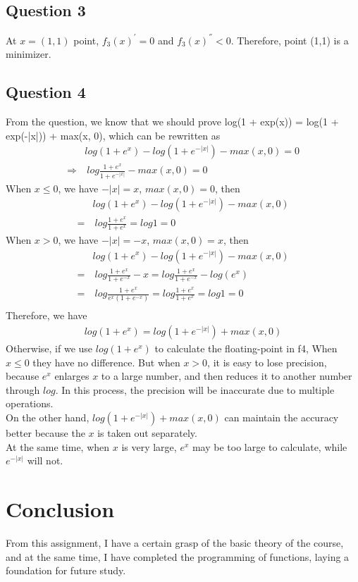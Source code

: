 \documentclass[a4paper,12pt]{article}
\begin{document}
\subsection{Question 3}
At $x = (1,1)$ point, $f_3(x)^{'} = 0$ and  $f_3(x)^{''} < 0$. Therefore, point (1,1) is a minimizer.
\subsection{Question 4}
From the question, we know that we should prove log(1 + exp(x)) = log(1 + exp(-|x|)) + max(x, 0), which can be rewritten as 
\begin{align*}
&log(1 + e^x) - log(1 + e^{-|x|}) - max(x, 0) = 0\\
\Rightarrow &\ log\frac{1 + e^x}{1 + e^{-|x|}} - max(x, 0) = 0
\end{align*}
When $x \leq 0$, we have $-|x| = x$, $max(x, 0) = 0$, then
\begin{align*}
&log(1 + e^x) - log(1 + e^{-|x|}) - max(x, 0) \\
=&\ log\frac{1 + e^x}{1 + e^{x}} = log1 = 0
\end{align*}
When $x > 0$, we have $-|x| = -x$, $max(x, 0) = x$, then
\begin{align*}
&log(1 + e^x) - log(1 + e^{-|x|}) - max(x, 0) \\
=&\ log\frac{1 + e^x}{1 + e^{-x}}  - x = log\frac{1 + e^x}{1 + e^{-x}}  - log(e^x) \\
=&\ log\frac{1 + e^x}{e^x(1 + e^{-x})} = log\frac{1 + e^x}{1 + e^x} = log1 = 0\\
\end{align*}
Therefore, we have 
\begin{align*}
log(1 + e^x) = log(1 + e^{-|x|}) + max(x, 0)
\end{align*}
Otherwise, if we use $log(1 + e^x)$ to calculate the floating-point in f4, When $x \leq 0$ they have no difference. But when $x > 0$, it is easy to lose precision, because $e^x$ enlarges $x$ to a large number, and then reduces it to another number through $log$. In this process, the precision will be inaccurate due to multiple operations.\\
On the other hand, $log(1 + e^{-|x|}) + max(x, 0)$ can maintain the accuracy better because the $x$ is taken out separately.\\
At the same time, when $x$ is very large, $e^x$ may be too large to calculate, while $e^{-|x|}$ will not.
\section{Conclusion}
From this assignment, I have a certain grasp of the basic theory of the course, and at the same time, I have completed the programming of functions, laying a foundation for future study.
\end{document}
